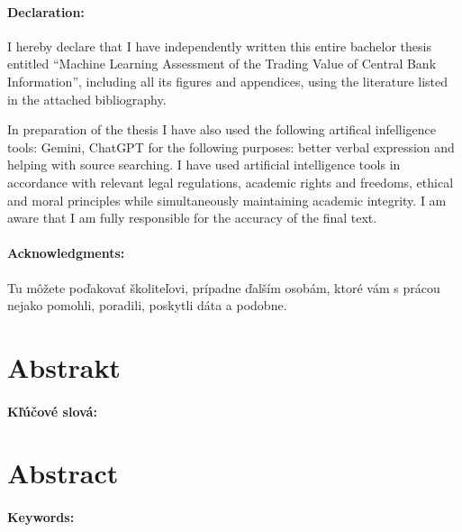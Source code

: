 \documentclass[12pt, oneside]{book}  %
\def\mfnazov{Machine Learning Assessment of the Trading Value of Central Bank Information}
\begin{document}




\newpage
\pagestyle{plain}
\paragraph{Declaration:}
I hereby declare that I have independently written this entire
bachelor thesis entitled ``\mfnazov'', including all its
figures and appendices, using the literature listed in the attached
bibliography.

In preparation of the thesis I have also used the following artifical
infelligence tools: Gemini, ChatGPT for the following purposes: 
better verbal expression and helping with source searching. I
have used artificial intelligence tools in accordance with relevant
legal regulations, academic rights and freedoms, ethical and moral
principles while simultaneously maintaining academic integrity. I am
aware that I am fully responsible for the accuracy of the final text.

\paragraph{Acknowledgments:} Tu môžete poďakovať školiteľovi, prípadne
ďalším osobám, ktoré vám s prácou nejako pomohli, poradili,
poskytli dáta a podobne.


\newpage 
\section*{Abstrakt}

\paragraph*{Kľúčové slová:} 


\newpage 
\section*{Abstract}

\paragraph*{Keywords:} 
\end{document}
